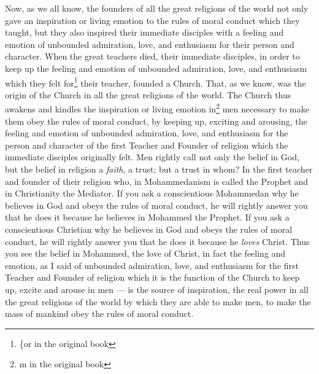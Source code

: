 Now, as we all know, the founders of all the great religions of the world not only gave an inspiration or living emotion to the rules of moral conduct which they taught, but they also inspired their immediate disciples with a feeling and emotion of unbounded admiration, love, and enthusiasm for their person and character.
When the great teachers died, their immediate disciples, in order to keep up the feeling and emotion of unbounded admiration, love, and enthusiasm which they felt for\footnote{\{or in the original book} their teacher, founded a Church.
That, as we know, was the origin of the Church in all the great religions of the world.
The Church thus awakens and kindles the inspiration or living emotion in\footnote{m in the original book} men necessary to make them obey the rules of moral conduct, by keeping up, exciting and arousing, the feeling and emotion of unbounded admiration, love, and enthusiasm for the person and character of the first Teacher and Founder of religion which the immediate disciples originally felt.
Men rightly call not only the belief in God, but the belief in religion a \emph{faith}, a trust; but a trust in whom?
In the first teacher and founder of their religion who, in Mohammedanism is called the Prophet and in Christianity the Mediator.
If you ask a conscientious Mohammedan why he believes in God and obeys the rules of moral conduct, he will rightly answer you that he does it because he believes in Mohammed the Prophet.
If you ask a conscientious Christian why he believes in God and obeys the rules of moral conduct, he will rightly answer you that he does it because he \emph{loves} Christ.
Thus you see the belief in Mohammed, the love of Christ, in fact the feeling and emotion, as I said of unbounded admiration, love, and enthusiasm for the first Teacher and Founder of religion which it is the function of the Church to keep up, excite and arouse in men --- is the source of inspiration, the real power in all the great religions of the world by which they are able to make men, to make the mass of mankind obey the rules of moral conduct\cite{num22}.

